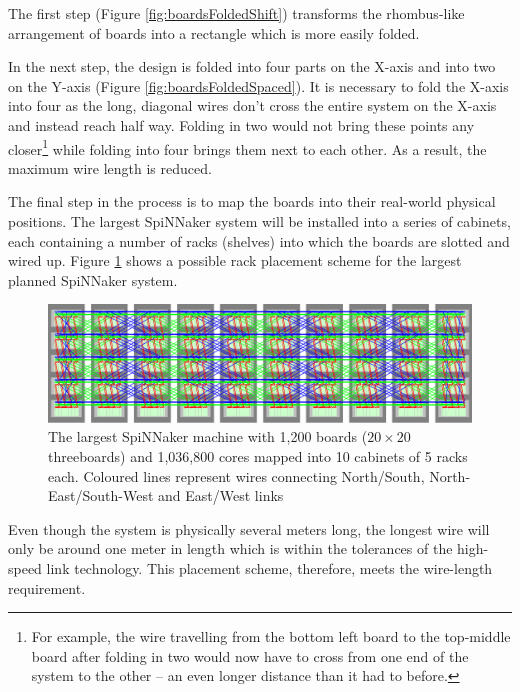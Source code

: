 			The first step (Figure \ref{fig:boardsFoldedShift}) transforms the
			rhombus-like arrangement of boards into a rectangle which is more easily
			folded.
			
			In the next step, the design is folded into four parts on the X-axis and
			into two on the Y-axis (Figure \ref{fig:boardsFoldedSpaced}). It is
			necessary to fold the X-axis into four as the long, diagonal wires don't
			cross the entire system on the X-axis and instead reach half way. Folding
			in two would not bring these points any closer\footnote{For example, the
			wire travelling from the bottom left board to the top-middle board after
			folding in two would now have to cross from one end of the system to the
			other -- an even longer distance than it had to before.} while folding
			into four brings them next to each other. As a result, the maximum wire
			length is reduced.
			
			The final step in the process is to map the boards into their real-world
			physical positions. The largest SpiNNaker system will be installed into a
			series of cabinets, each containing a number of racks (shelves) into which
			the boards are slotted and wired up. Figure \ref{fig:spinnaker106} shows a
			possible rack placement scheme for the largest planned SpiNNaker system.
			
			\begin{figure}
				\center
				\includegraphics[width=\textwidth]{figures/spinnaker106}
				\caption[The largest SpiNNaker machine mapped into cabinets and
				racks]{The largest SpiNNaker machine with 1,200 boards ($20\times20$
				threeboards) and 1,036,800 cores mapped into 10 cabinets of 5 racks
				each.  Coloured lines represent wires connecting
				{\color{red}North/South}, {\color{green}North-East/South-West} and
				{\color{blue}East/West} links}
				\label{fig:spinnaker106}
			\end{figure}
			
			Even though the system is physically several meters long, the longest wire
			will only be around one meter in length which is within the tolerances of
			the high-speed link technology. This placement scheme, therefore, meets the
			wire-length requirement.
			
